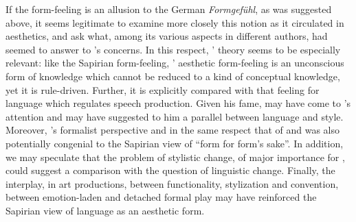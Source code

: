 \documentclass[output=paper]{langscibook}
\begin{document}
If the form-feeling is an allusion to the German \emph{Formgefühl}, as was suggested above, it seems legitimate to examine more closely this notion as it circulated in aesthetics, and ask what, among its various aspects in different authors, had seemed to answer to {\Sapir}'s concerns. In this respect, {\Lipps}' theory seems to be especially relevant: like the Sapirian form-feeling, {\Lipps}' aesthetic form-feeling is an unconscious form of knowledge which cannot be reduced to a kind of conceptual knowledge, yet it is rule-driven. Further, it is explicitly compared with that feeling for language which regulates speech production. Given his fame, {} may have come to {\Sapir}'s attention and may have suggested to him a parallel between language and style. Moreover, {}'s formalist perspective and in the same respect that of {\Lipps} and {\Dessoir} was also potentially congenial to the Sapirian view of ``form for form’s sake''. In addition, we may speculate that the problem of stylistic change, of major importance for {}, could suggest a comparison with the question of linguistic change. Finally, the interplay, in art productions, between functionality, stylization and convention, between emotion-laden and detached formal play may have reinforced the Sapirian view of language as an aesthetic form.

\sloppy
\printbibliography[heading=subbibliography,notkeyword=this]
\end{document}
